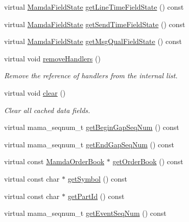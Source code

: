 \begin{CompactItemize}
\item 
virtual \hyperlink{namespaceWombat_93aac974f2ab713554fd12a1fa3b7d2a}{Mamda\-Field\-State} \hyperlink{classMamdaQuoteToBookListener_72349a0b38fd3b0d53f80d29f09721c1}{get\-Line\-Time\-Field\-State} () const 
\item 
virtual \hyperlink{namespaceWombat_93aac974f2ab713554fd12a1fa3b7d2a}{Mamda\-Field\-State} \hyperlink{classMamdaQuoteToBookListener_3105e19fc56da0ddec1a79304a151a43}{get\-Send\-Time\-Field\-State} () const 
\item 
virtual \hyperlink{namespaceWombat_93aac974f2ab713554fd12a1fa3b7d2a}{Mamda\-Field\-State} \hyperlink{classMamdaQuoteToBookListener_62ad9b9cfc10f553c2b39cd54610ff8c}{get\-Msg\-Qual\-Field\-State} () const 
\item 
virtual void \hyperlink{classMamdaQuoteToBookListener_41f6149d1c5e0dd70d57998fcd81feb2}{remove\-Handlers} ()
\begin{CompactList}\small\item\em Remove the reference of handlers from the internal list. \item\end{CompactList}\item 
virtual void \hyperlink{classMamdaQuoteToBookListener_5d9ebf5190378ca7181473811c4d20c7}{clear} ()
\begin{CompactList}\small\item\em Clear all cached data fields. \item\end{CompactList}\item 
virtual mama\_\-seqnum\_\-t \hyperlink{classMamdaQuoteToBookListener_92174a71081aee1456debac14ad05cf6}{get\-Begin\-Gap\-Seq\-Num} () const 
\item 
virtual mama\_\-seqnum\_\-t \hyperlink{classMamdaQuoteToBookListener_a40dd460d8463a312bba66e4b689d27e}{get\-End\-Gap\-Seq\-Num} () const 
\item 
virtual const \hyperlink{classWombat_1_1MamdaOrderBook}{Mamda\-Order\-Book} $\ast$ \hyperlink{classMamdaQuoteToBookListener_e63faf479027ccc1c72b156847832c9d}{get\-Order\-Book} () const 
\item 
virtual const char $\ast$ \hyperlink{classMamdaQuoteToBookListener_c93b05e297f0b56ee750c931c0c332da}{get\-Symbol} () const 
\item 
virtual const char $\ast$ \hyperlink{classMamdaQuoteToBookListener_67a3d0c1e838d687724c0d20f15849cc}{get\-Part\-Id} () const 
\item 
virtual mama\_\-seqnum\_\-t \hyperlink{classMamdaQuoteToBookListener_ad266e6ce78c83599aa9b0c380f2b5e0}{get\-Event\-Seq\-Num} () const 

\end{CompactItemize}
